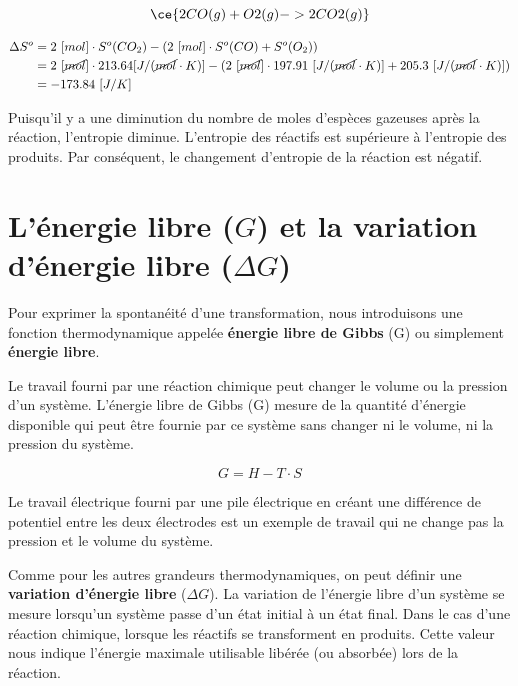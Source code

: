 \documentclass[
  11pt,
  a4paper,
  openany]{book}
\begin{document}
\begin{Answer}

\[ \ce{2 CO(g) + O2(g) -> 2CO2(g)} \]

\[
\begin{split}
\Delta S^o &= 2\ [mol] \cdot S^o(CO_2) - ( 2\ [mol] \cdot S^o(CO) + S^o(O_2) ) \\
&= 2\ [\cancel{mol}] \cdot 213.64 [J/(\cancel{mol} \cdot K)] - ( 2\ [\cancel{mol}] \cdot 197.91\ [J/(\cancel{mol} \cdot K)] + 205.3\ [J/(\cancel{mol} \cdot K)] ) \\
&= -173.84\ [J/K]
\end{split}
\]

Puisqu'il y a une diminution du nombre de moles d'espèces gazeuses après la réaction, l'entropie diminue. L'entropie des réactifs est supérieure à l'entropie des produits. Par conséquent, le changement d'entropie de la réaction est négatif.

\clearpage

\end{Answer}

\section{\texorpdfstring{L'énergie libre (\(G\)) et la variation d'énergie libre (\(\Delta G\))}{L'énergie libre (G) et la variation d'énergie libre (\textbackslash Delta G)}}\label{luxe9nergie-libre-g-et-la-variation-duxe9nergie-libre-delta-g}

Pour exprimer la spontanéité d'une transformation, nous introduisons une fonction thermodynamique appelée \textbf{énergie libre de Gibbs} (G) ou simplement \textbf{énergie libre}.

Le travail fourni par une réaction chimique peut changer le volume ou la pression d'un système. L'énergie libre de Gibbs (G) mesure de la quantité d'énergie disponible qui peut être fournie par ce système sans changer ni le volume, ni la pression du système.

\[
G = H - T \cdot S
\]

Le travail électrique fourni par une pile électrique en créant une différence de potentiel entre les deux électrodes est un exemple de travail qui ne change pas la pression et le volume du système.

Comme pour les autres grandeurs thermodynamiques, on peut définir une \textbf{variation d'énergie libre} (\(\Delta G\)). La variation de l'énergie libre d'un système se mesure lorsqu'un système passe d'un état initial à un état final. Dans le cas d'une réaction chimique, lorsque les réactifs se transforment en produits. Cette valeur nous indique l'énergie maximale utilisable libérée (ou absorbée) lors de la réaction.
\end{document}
